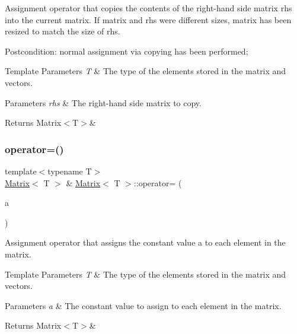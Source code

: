 Assignment operator that copies the contents of the right-\/hand side matrix {\ttfamily rhs} into the current matrix. If matrix and rhs were different sizes, matrix has been resized to match the size of {\ttfamily rhs}. 

Postcondition\+: normal assignment via copying has been performed;


\begin{DoxyTemplParams}{Template Parameters}
{\em T} & The type of the elements stored in the matrix and vectors. \\
\hline
\end{DoxyTemplParams}

\begin{DoxyParams}{Parameters}
{\em rhs} & The right-\/hand side matrix to copy. \\
\hline
\end{DoxyParams}
\begin{DoxyReturn}{Returns}
Matrix$<$\+T$>$\& 
\end{DoxyReturn}
\mbox{\label{classMatrix_a603960a94121d9b35509199de88d1a92}} 
\subsubsection{\texorpdfstring{operator=()}{operator=()}\hspace{0.1cm}{\footnotesize\ttfamily [2/2]}}
{\footnotesize\ttfamily template$<$typename T$>$ \\
\mbox{\hyperlink{classMatrix}{Matrix}}$<$ T $>$ \& \mbox{\hyperlink{classMatrix}{Matrix}}$<$ T $>$\+::operator= (\begin{DoxyParamCaption}\item[{const T \&}]{a }\end{DoxyParamCaption})\hspace{0.3cm}{\ttfamily [inline]}}



Assignment operator that assigns the constant value {\ttfamily a} to each element in the matrix. 


\begin{DoxyTemplParams}{Template Parameters}
{\em T} & The type of the elements stored in the matrix and vectors. \\
\hline
\end{DoxyTemplParams}

\begin{DoxyParams}{Parameters}
{\em a} & The constant value to assign to each element in the matrix. \\
\hline
\end{DoxyParams}
\begin{DoxyReturn}{Returns}
Matrix$<$\+T$>$\& 
\end{DoxyReturn}
\mbox{\label{classMatrix_a771eff354da6c0008228dc19cde4142a}} 
